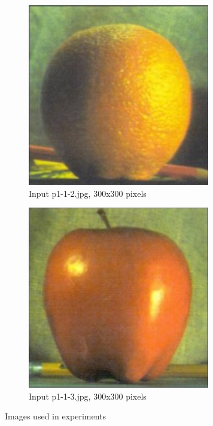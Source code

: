 \begin{figure}[h!]
\begin{subfigure}{0.5\textwidth}
  \centering
  \includegraphics[width=0.5\linewidth]{input/p1-1-2.png}
  \caption{Input p1-1-2.jpg, 300x300 pixels}
\end{subfigure}%
\begin{subfigure}{0.5\textwidth}
  \centering
  \includegraphics[width=0.5\linewidth]{input/p1-1-3.png}
  \caption{Input p1-1-3.jpg, 300x300 pixels}
\end{subfigure}
 \caption{Images used in experiments}
\label{fig:Input-images}
\end{figure}


